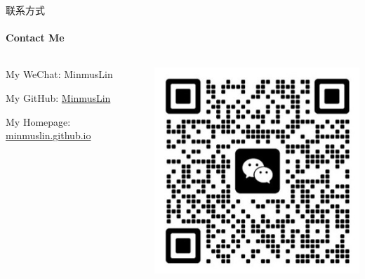 \documentclass{beamer}
\newcommand{\hrefcol}[2]{\textcolor{cyan}{\href{#1}{#2}}}
\begin{document}
\begin{frame}[fragile]{联系方式}
\framesubtitle{Contact Me}
\begin{columns}
\begin{column}{0.6\textwidth}
My WeChat: MinmusLin

\vspace{1em}

My GitHub: \hrefcol{https://github.com/MinmusLin}{MinmusLin}

\vspace{1em}

My Homepage: \hrefcol{https://minmuslin.github.io}{minmuslin.github.io}
\end{column}
\begin{column}{0.4\textwidth}
\includegraphics[width=\textwidth]
{figures/wechat}
\end{column}
\end{columns}
\end{frame}


\backmatter
\end{document}

